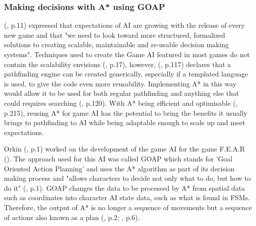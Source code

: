 \documentclass[11pt, a4paper]{article}
\begin{document}
\subsubsection{Making decisions with A* using GOAP}

\citeauthor{orkin2003applying} (\citeyear{orkin2003applying}, p.11) expressed that expectations of AI are growing with the release of every new game and that "we need to look toward more structured, formalized solutions to creating scalable, maintainable and re-usable decision making systems". Techniques used to create the Game AI featured in most games do not contain the scalability \citeauthor{orkin2003applying} envisions (\cite{laird2001human}, p.17), however, \citeauthor{higgins2002generic} (\citeyear{higgins2002generic}, p.117) declares that a pathfinding engine can be created generically, especially if a templated language is used, to give the code even more reusability. Implementing A* in this way would allow it to be used for both regular pathfinding and anything else that could requires searching (\cite{higgins2002generic}, p.120). With A* being efficient and optimisable (\cite{millington2019ai}, p.215), reusing A* for game AI has the potential to bring the benefits it usually brings to pathfinding to AI while being adaptable enough to scale up and meet expectations.

Orkin (\citeyear{orkin2006three}, p.1) worked on the development of the game AI for the game F.E.A.R (\cite{FEAR}). The approach used for this AI was called GOAP which stands for 'Goal Oriented Action Planning' and uses the A* algorithm as part of its decision making process and "allows characters to decide not only what to do, but how to do it" (\cite{orkin2003applying}, p.1). GOAP changes the data to be processed by A* from spatial data such as coordinates into character AI state data, such as what is found in FSMs. Therefore, the output of A* is no longer a sequence of movements but a sequence of actions also known as a plan (\cite{orkin2003applying}, p.2; \cite{tozour2002evolution}, p.6).
\end{document}

